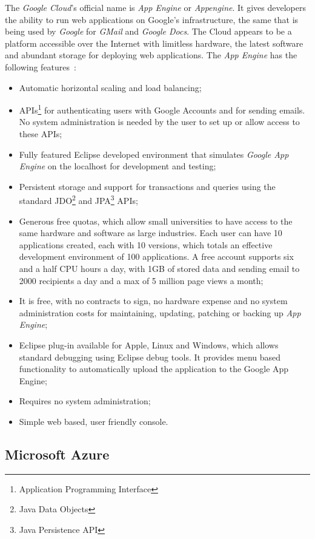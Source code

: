 The \textit{Google Cloud}'s official name is \textit{App Engine} or \textit{Appengine}. It gives developers the ability to run web applications on Google's infrastructure, the same that is being used by \textit{Google} for \textit{GMail} and \textit{Google Docs}.
The Cloud appears to be a platform accessible over the Internet with limitless hardware, the latest software and abundant storage for deploying web applications.
The \textit{App Engine} has the following features~\cite{googleapp}:
\begin{itemize}
\item Automatic horizontal scaling and load balancing;
\item APIs\footnote{Application Programming Interface} for authenticating users with Google Accounts and for sending emails. No system administration is needed by the user to set up or allow access to these APIs;
\item Fully featured Eclipse developed environment that simulates \textit{Google App Engine} on the localhost for development and testing;
\item Persistent storage and support for transactions and queries using the standard JDO\footnote{Java Data Objects} and JPA\footnote{Java Persistence API} APIs;
\item Generous free quotas, which allow small universities to have access to the same hardware and software as large industries. Each user can have 10 applications created, each with 10 versions, which totals an effective development environment of 100 applications. A free account supports six and a half CPU hours a day, with 1GB of stored data and sending email to 2000 recipients a day and a max of 5 million page views a month;
\item It is free, with no contracts to sign, no hardware expense and no system administration costs for maintaining, updating, patching or backing up \textit{App Engine};
\item Eclipse plug-in available for Apple, Linux and Windows, which allows standard debugging using Eclipse debug tools. It provides menu based functionality to automatically upload the application to the Google App Engine;
\item Requires no system administration;
\item Simple web based, user friendly console.
\end{itemize} 

\subsection{Microsoft Azure}\label{azure}

